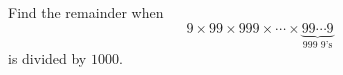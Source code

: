 Find the remainder when \[9 \times 99 \times 999 \times \cdots \times \underbrace{99\cdots9}_{\text{999 9's}}\]is divided by $ 1000$.